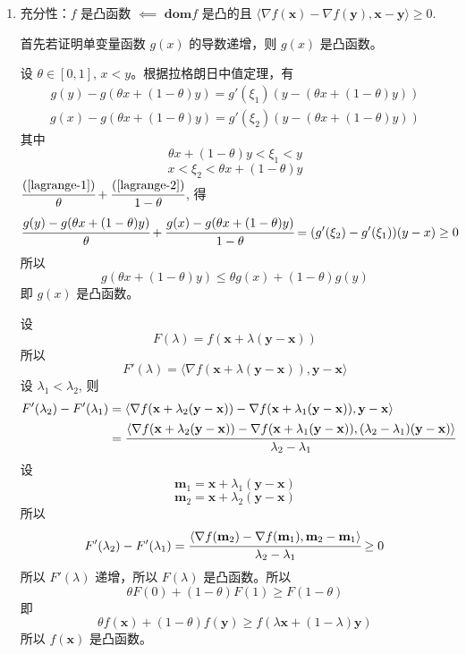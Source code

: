 \documentclass[11pt,letter,notitlepage]{article}
\newcommand{\dom}{ \textbf{dom}  }
\begin{document}
\begin{solution}
\begin{enumerate}
		      (\ref{ineq3})-(\ref{ineq1}), 得

		      $$\langle \nabla f(\mathbf{x}) - \nabla f(\mathbf{y}) , \mathbf{x} - \mathbf{y} \rangle \geq 0$$

		\item 充分性：$f$ 是凸函数 $\impliedby$ $\dom f$ 是凸的且 $\langle \nabla f(\mathbf{x}) - \nabla f(\mathbf{y}) , \mathbf{x} - \mathbf{y} \rangle \geq 0$.

		      首先若证明单变量函数 $g(x)$ 的导数递增，则 $g(x)$ 是凸函数。

		      设 $\theta \in [0,1]$, $x<y$。根据拉格朗日中值定理，有
		      \begin{align}\label{lagrange-1}
			      g(y)-g(\theta x+(1-\theta)y)=g'(\xi_1)(y-(\theta x+(1-\theta)y))
		      \end{align}
		      \begin{align}\label{lagrange-2}
			      g(x)-g(\theta x+(1-\theta)y)=g'(\xi_2)(y-(\theta x+(1-\theta)y))
		      \end{align}
		      其中
		      $$\theta x+(1-\theta)y<\xi_1<y$$
		      $$x<\xi_2<\theta x+(1-\theta)y$$
		      $\cfrac{(\ref{lagrange-1})}{\theta}+\cfrac{(\ref{lagrange-2})}{1-\theta}$, 得
		      $$\cfrac{g(y)-g(\theta x+(1-\theta)y)}{\theta}+\cfrac{g(x)-g(\theta x+(1-\theta)y)}{1-\theta}
			      =(g'(\xi_2)-g'(\xi_1))(y-x) \ge0$$
		      所以
		      $$g(\theta x+(1-\theta)y) \le \theta g(x)+(1-\theta)g(y)$$
		      即 $g(x)$ 是凸函数。

		      设
		      $$F(\lambda)=f(\mathbf{x}+\lambda(\mathbf{y}-\mathbf{x}))$$
		      所以
		      $$F'(\lambda)=\langle \nabla f(\mathbf{x}+\lambda(\mathbf{y}-\mathbf{x})),\mathbf{y}-\mathbf{x} \rangle$$
		      设 $\lambda_1 < \lambda_2$, 则
		      $$\begin{aligned}
				      F'(\lambda_2)-F'(\lambda_1)
				       & = \langle \nabla f(\mathbf{x}+\lambda_2(\mathbf{y}-\mathbf{x}))-\nabla f(\mathbf{x}+\lambda_1(\mathbf{y}-\mathbf{x})) , \mathbf{y}-\mathbf{x} \rangle                                                     \\
				       & = \cfrac{\langle \nabla f(\mathbf{x}+\lambda_2(\mathbf{y}-\mathbf{x}))-\nabla f(\mathbf{x}+\lambda_1(\mathbf{y}-\mathbf{x})) , (\lambda_2-\lambda_1)(\mathbf{y}-\mathbf{x}) \rangle}{\lambda_2-\lambda_1}
			      \end{aligned}$$
		      设
		      $$\mathbf{m}_1=\mathbf{x}+\lambda_1(\mathbf{y}-\mathbf{x})$$
		      $$\mathbf{m}_2=\mathbf{x}+\lambda_2(\mathbf{y}-\mathbf{x})$$
		      所以
		      $$F'(\lambda_2)-F'(\lambda_1)
			      =\cfrac{
				      \langle \nabla f(\mathbf{m}_2)-\nabla f(\mathbf{m}_1), \mathbf{m}_2-\mathbf{m}_1 \rangle
			      }{\lambda_2-\lambda_1}
			      \ge 0$$
		      所以 $F'(\lambda)$ 递增，所以 $F(\lambda)$ 是凸函数。所以
		      $$\theta F(0)+(1-\theta)F(1) \ge F(1-\theta)$$
		      即
		      $$\theta f(\mathbf{x}) + (1-\theta)f(\mathbf{y})
			      \ge f(\lambda\mathbf{x}+(1-\lambda)\mathbf{y})$$
		      所以 $f(\mathbf{x})$ 是凸函数。
	\end{enumerate}
\end{solution}
\end{document}
